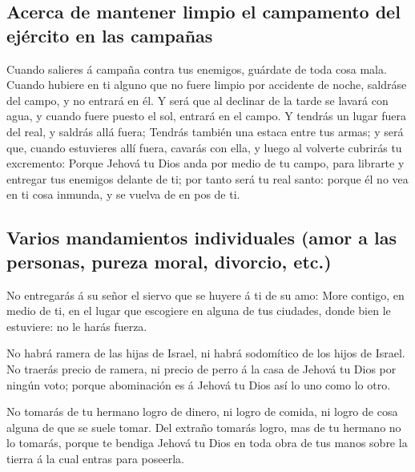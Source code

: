 \hypertarget{acerca-de-mantener-limpio-el-campamento-del-ejuxe9rcito-en-las-campauxf1as}{%
\subsection{Acerca de mantener limpio el campamento del ejército en las
campañas}\label{acerca-de-mantener-limpio-el-campamento-del-ejuxe9rcito-en-las-campauxf1as}}

 Cuando salieres á campaña contra tus enemigos, guárdate
de toda cosa mala.  Cuando hubiere en ti alguno que no
fuere limpio por accidente de noche, saldráse del campo, y no entrará en
él.  Y será que al declinar de la tarde se lavará con
agua, y cuando fuere puesto el sol, entrará en el campo. 
Y tendrás un lugar fuera del real, y saldrás allá fuera; 
Tendrás también una estaca entre tus armas; y será que, cuando
estuvieres allí fuera, cavarás con ella, y luego al volverte cubrirás tu
excremento:  Porque Jehová tu Dios anda por medio de tu
campo, para librarte y entregar tus enemigos delante de ti; por tanto
será tu real santo: porque él no vea en ti cosa inmunda, y se vuelva de
en pos de ti.

\hypertarget{varios-mandamientos-individuales-amor-a-las-personas-pureza-moral-divorcio-etc.}{%
\subsection{Varios mandamientos individuales (amor a las personas,
pureza moral, divorcio,
etc.)}\label{varios-mandamientos-individuales-amor-a-las-personas-pureza-moral-divorcio-etc.}}

 No entregarás á su señor el siervo que se huyere á ti de
su amo:  More contigo, en medio de ti, en el lugar que
escogiere en alguna de tus ciudades, donde bien le estuviere: no le
harás fuerza.

 No habrá ramera de las hijas de Israel, ni habrá
sodomítico de los hijos de Israel.  No traerás precio de
ramera, ni precio de perro á la casa de Jehová tu Dios por ningún voto;
porque abominación es á Jehová tu Dios así lo uno como lo otro.

 No tomarás de tu hermano logro de dinero, ni logro de
comida, ni logro de cosa alguna de que se suele tomar. 
Del extraño tomarás logro, mas de tu hermano no lo tomarás, porque te
bendiga Jehová tu Dios en toda obra de tus manos sobre la tierra á la
cual entras para poseerla.

